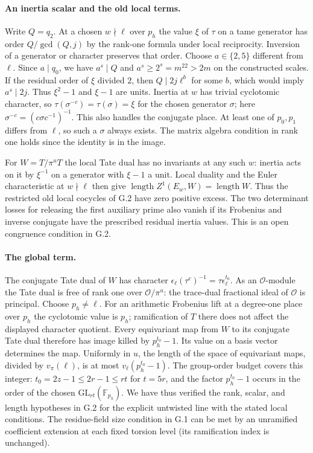 \paragraph{An inertia scalar and the old local terms.}
Write $Q=q_2$. At a chosen $w\nmid\ell$ over $p_h$ the value $\xi$
of $\tau$ on a tame generator has order $Q/\gcd(Q,j)$ by the
rank-one formula under local reciprocity. Inversion of a generator or
character preserves that order. Choose $a\in\{2,5\}$ different from
$\ell$. Since $a\mid q_0$, we have $a^s\mid Q$ and
$a^s\ge 2^s=m^{22}>2m$ on the constructed scales. If the residual
order of $\xi$ divided $2$, then $Q\mid 2j\ell^b$ for some $b$,
which would imply $a^s\mid 2j$. Thus $\xi^2-1$ and $\xi-1$ are
units. Inertia at $w$ has trivial cyclotomic character, so
$\tau(\sigma^{-c})=\tau(\sigma)=\xi$ for the chosen generator $\sigma$;
here $\sigma^{-c}=(c\sigma c^{-1})^{-1}$. This also handles the
conjugate place. At least one of $p_0,p_1$ differs from $\ell$,
so such a $\sigma$ always exists. The matrix algebra condition in
rank one holds since the identity is in the image.

For $W=T/\pi^u T$ the local Tate dual has no invariants at any such
$w$: inertia acts on it by $\xi^{-1}$ on a generator with $\xi-1$
a unit. Local duality and the Euler characteristic at $w\nmid\ell$
then give $\operatorname{length} Z^1(E_w,W)=\operatorname{length}W$.
Thus the restricted old local cocycles of G.2 have zero positive excess.
The two determinant losses for releasing the first auxiliary prime also
vanish if its Frobenius and inverse conjugate have the prescribed
residual inertia values. This is an open congruence condition in G.2.

\paragraph{The global term.}
The conjugate Tate dual of $W$ has character
$\epsilon_\ell(\tau^c)^{-1}=\tau\epsilon_\ell^{t_0}$.
As an $\mathcal O$-module the Tate dual is free of rank one over
$\mathcal O/\pi^u$: the trace-dual fractional ideal of $\mathcal O$
is principal. Choose $p_h\ne\ell$. For an arithmetic Frobenius lift
at a degree-one place over $p_h$ the cyclotomic value is $p_h$;
ramification of $T$ there does not affect the displayed character
quotient. Every equivariant map from $W$ to its conjugate Tate dual
therefore has image killed by $p_h^{t_0}-1$. Its value on a basis vector
determines the map. Uniformly in $u$, the length of the space of
equivariant maps, divided by $v_\pi(\ell)$, is at most
$v_\ell(p_h^{t_0}-1)$. The group-order budget covers this integer:
$t_0=2z-1\le 2r-1\le r t$ for $t=5r$, and the factor
$p_h^{t_0}-1$ occurs in the order of the chosen
$\mathrm{GL}_{rt}(\mathbb F_{p_h})$.
We have thus verified the rank, scalar, and length hypotheses in G.2
for the explicit untwisted line with the stated local conditions.
The residue-field size condition in G.1 can be met by an unramified
coefficient extension at each fixed torsion level (its ramification
index is unchanged).

